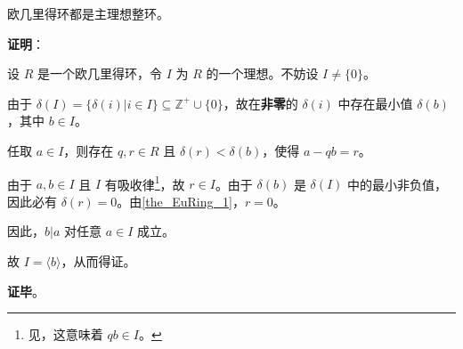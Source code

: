 \begin{theorem}{}
欧几里得环都是主理想整环。
\end{theorem}

\textbf{证明}：

设 $R$ 是一个欧几里得环，令 $I$ 为 $R$ 的一个理想。不妨设 $I\not=\{0\}$。

由于 $\delta(I)=\{\delta(i)|i\in I\}\subseteq\mathbb{Z}^+\cup\{0\}$，故在\textbf{非零}的 $\delta(i)$ 中存在最小值 $\delta(b)$，其中 $b\in I$。

任取 $a\in I$，则存在 $q, r\in R$ 且 $\delta(r)<\delta(b)$，使得 $a-qb=r$。

由于 $a, b\in I$ 且 $I$ 有吸收律\footnote{见，这意味着 $qb\in I$。}，故 $r\in I$。由于 $\delta(b)$ 是 $\delta(I)$ 中的最小非负值，因此必有 $\delta(r)=0$。由\autoref{the_EuRing_1}，$r=0$。

因此，$b|a$ 对任意 $a\in I$ 成立。

故 $I=\langle b \rangle$，从而得证。

\textbf{证毕}。



